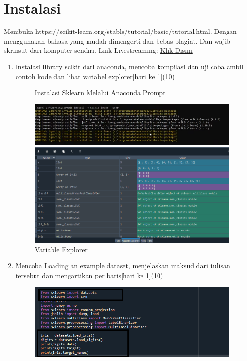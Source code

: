 \section{Instalasi}
Membuka https://scikit-learn.org/stable/tutorial/basic/tutorial.html. Dengan menggunakan bahasa yang mudah dimengerti dan bebas plagiat. 
Dan wajib skrinsut dari komputer sendiri.
\newline Link Livestreaming: \href{https://youtu.be/sJbFyIBI_Jk}{Klik Disini}
\begin{enumerate}
\item
Instalasi library scikit dari anaconda, mencoba kompilasi dan uji coba ambil contoh kode dan lihat variabel explorer[hari ke 1](10)
\begin{figure}[!htbp]
    \centering
	\caption{Instalasi Sklearn Melalui Anaconda Prompt}
   	\includegraphics[scale=0.4]{figures/chapter 1/instalasi/1/cmdInstalasiSklearn.PNG}
	\caption{Variable Explorer}
	\includegraphics[scale=0.4]{figures/chapter 1/instalasi/1/variableExplorer.PNG}
\end{figure}
\item
Mencoba Loading an example dataset, menjelaskan maksud dari tulisan tersebut dan mengartikan per baris[hari ke 1](10)
\begin{figure}[!htbp]
    \centering
   	\includegraphics[scale=0.4]{figures/chapter 1/LoadDataset/SourceCode.PNG}

\end{figure}
\end{enumerate}
